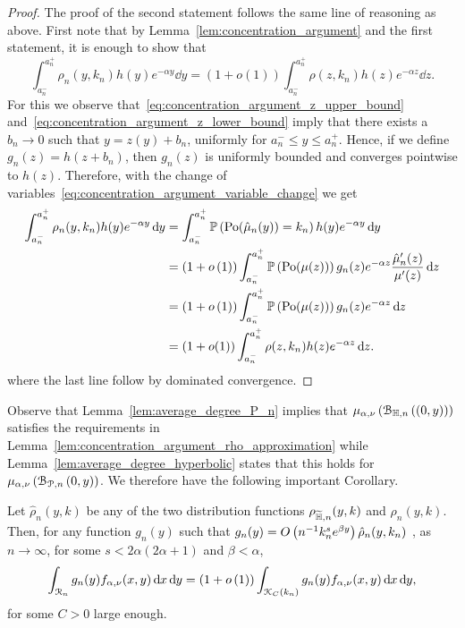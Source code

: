 \begin{proof}
The proof of the second statement follows the same line of reasoning as above. First note that by Lemma~\ref{lem:concentration_argument} and the first statement, it is enough to show that
\[
	\int_{a_n^-}^{a_n^+} \rho_n(y,k_n) h(y) e^{-\alpha y} \dd y
	= \left(1 + o(1)\right) \int_{a_n^-}^{a_n^+} \rho(z,k_n) h(z) e^{-\alpha z} \dd z.
\] 
For this we observe that~\eqref{eq:concentration_argument_z_upper_bound} and~\eqref{eq:concentration_argument_z_lower_bound} imply that there exists a $b_n \to 0$ such that $y = z(y) + b_n$, uniformly for $a_n^- \le y \le a_n^+$. Hence, if we define $g_n(z) = h(z + b_n)$, then $g_n(z)$ is uniformly bounded and converges pointwise to $h(z)$.  Therefore, with the change of variables~\eqref{eq:concentration_argument_variable_change} we get
\begin{align*}
	\int_{a_n^-}^{a_n^+} \rho_n(y,k_n) h(y) e^{-\alpha y} \operatorname{\mathrm{d}\hspace{-2pt}} y
	&=  \int_{a_n^-}^{a_n^+} \mathbb{P}\left({\mathrm{Po}}(\hat{\mu}_n(y)) = k_n\right) h(y) e^{-\alpha y} \operatorname{\mathrm{d}\hspace{-2pt}} y\\
	&= (1 + o\left(1\right))\int_{a_n^-}^{a_n^+}  \mathbb{P}\left({\mathrm{Po}}(\mu(z))\right)
		g_n(z) e^{-\alpha z} \frac{\hat{\mu}_n^\prime(z)}{\mu^{\prime}(z)} \operatorname{\mathrm{d}\hspace{-2pt}} z\\
	&= (1 + o\left(1\right))\int_{a_n^-}^{a_n^+}  \mathbb{P}\left({\mathrm{Po}}(\mu(z))\right)
		g_n(z) e^{-\alpha z} \operatorname{\mathrm{d}\hspace{-2pt}} z\\
	&= \left(1 + o(1)\right) \int_{a_n^-}^{a_n^+} \rho(z,k_n) h(z) e^{-\alpha z} \operatorname{\mathrm{d}\hspace{-2pt}} z.
\end{align*}
where the last line follow by dominated convergence.
\end{proof}

Observe that Lemma~\ref{lem:average_degree_P_n} implies that $\mu_{\alpha,\nu}\left({\mathcal B}_{\mathbb{H},n}\left((0,y)\right)\right)$ satisfies the requirements in Lemma~\ref{lem:concentration_argument_rho_approximation} while Lemma~\ref{lem:average_degree_hyperbolic} states that this holds for $\mu_{\alpha,\nu}\left({\mathcal B}_{{\mathcal P},n}\left(0,y\right)\right)$. We therefore have the following important Corollary.

\begin{corollary}\label{cor:concentration_argument_other_models}
Let $\hat{\rho}_n(y,k)$ be any of the two distribution functions $\rho_{\widetilde{\mathbb{H}},n}(y,k)$ and $\rho_{n}(y,k)$. Then, for any function $g_n(y)$ such that $g_n(y) = O\left(n^{-1} k_n^{s} e^{\beta y}\right)\hat{\rho}_n(y,k_n)$ , as $n \to \infty$, for some $s < 2\alpha(2\alpha + 1)$ and $\beta < \alpha$,
\[
	\int_{{\mathcal R}_n} g_n(y) f_{\alpha,\nu}(x,y) \operatorname{\mathrm{d}\hspace{-2pt}} x \operatorname{\mathrm{d}\hspace{-2pt}} y
	= (1+o\left(1\right))\int_{{\mathcal K}_C(k_n)} g_n(y) f_{\alpha,\nu}(x,y) \operatorname{\mathrm{d}\hspace{-2pt}} x \operatorname{\mathrm{d}\hspace{-2pt}} y,
\]
for some $C > 0$ large enough.
\end{corollary}

